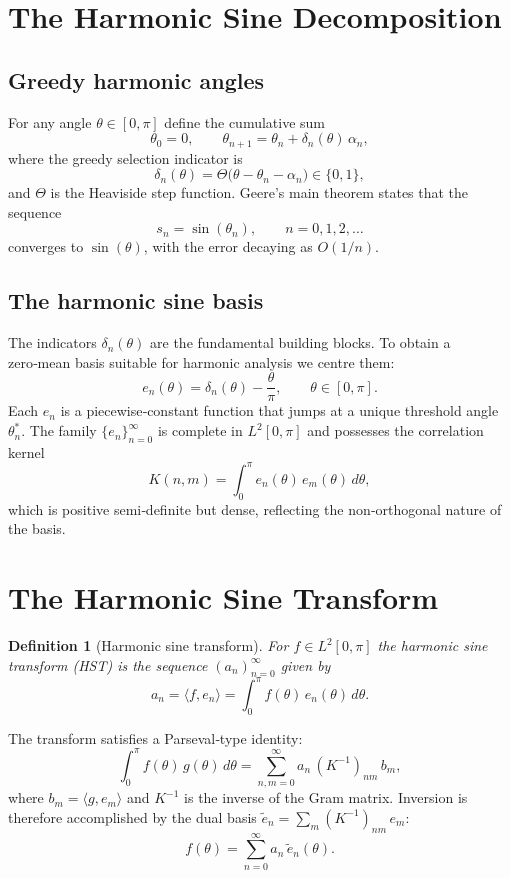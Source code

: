 \documentclass[11pt,a4paper]{article}
\newtheorem{definition}{Definition}
\begin{document}
\section{The Harmonic Sine Decomposition}
\subsection{Greedy harmonic angles}
For any angle $\theta \in [0,\pi]$ define the cumulative sum
\[
\theta_0 = 0, \qquad
\theta_{n+1} = \theta_n + \delta_n(\theta)\,\alpha_n,
\]
where the greedy selection indicator is
\[
\delta_n(\theta) = \Theta\bigl( \theta - \theta_n - \alpha_n \bigr) \in \{0,1\},
\]
and $\Theta$ is the Heaviside step function.
Geere’s main theorem states that the sequence
\[
s_n = \sin(\theta_n), \qquad n = 0,1,2,\dots
\]
converges to $\sin(\theta)$, with the error decaying as $O(1/n)$.

\subsection{The harmonic sine basis}
The indicators $\delta_n(\theta)$ are the fundamental building blocks. To obtain a zero‑mean basis suitable for harmonic analysis we centre them:
\[
e_n(\theta) = \delta_n(\theta) - \frac{\theta}{\pi}, \qquad \theta \in [0,\pi].
\]
Each $e_n$ is a piecewise‑constant function that jumps at a unique threshold angle $\theta_n^*$. The family $\{e_n\}_{n=0}^\infty$ is complete in $L^2[0,\pi]$ and possesses the correlation kernel
\[
K(n,m) = \int_0^\pi e_n(\theta)\, e_m(\theta)\, d\theta,
\]
which is positive semi‑definite but dense, reflecting the non‑orthogonal nature of the basis.

\section{The Harmonic Sine Transform}
\begin{definition}[Harmonic sine transform]
For $f \in L^2[0,\pi]$ the \emph{harmonic sine transform} (HST) is the sequence $(a_n)_{n=0}^\infty$ given by
\[
a_n = \langle f, e_n \rangle = \int_0^\pi f(\theta)\, e_n(\theta)\, d\theta.
\]
\end{definition}

The transform satisfies a Parseval‑type identity:
\[
\int_0^\pi f(\theta)\, g(\theta)\, d\theta
   = \sum_{n,m=0}^\infty a_n \, (K^{-1})_{nm} \, b_m,
\]
where $b_m = \langle g, e_m \rangle$ and $K^{-1}$ is the inverse of the Gram matrix. Inversion is therefore accomplished by the dual basis $\tilde{e}_n = \sum_m (K^{-1})_{nm}\, e_m$:
\[
f(\theta) = \sum_{n=0}^\infty a_n \, \tilde{e}_n(\theta).
\]
\end{document}
